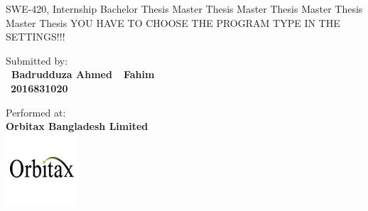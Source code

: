 


\pagestyle{empty}




\begin{center}

\vspace{0.8cm}

\begin{minipage}[t][5cm][s]{\textwidth}%
\centering
\Huge{{}}
\LARGE{{\color{FH2}{\fontsize{16}{24} \selectfont \subTitle\\}}}
\end{minipage}

\ifuseBachelorMediaTechnologiesOne
	\LARGE{SWE-420, Internship }
\else
	\ifuseBachelorMediaTechnologiesTwo
		\LARGE{Bachelor Thesis}
\else
	\ifuseMasterInteractiveTechnologies
		\LARGE{Master Thesis}
\else
	\ifuseMasterDigitalDesign
		\LARGE{Master Thesis}
\else
    \ifuseMasterDigitalMediaProduction
		\LARGE{Master Thesis}
\else
	\ifuseMasterDigitalHealthCare
		\LARGE{Master Thesis}
    \else
        \LARGE{YOU HAVE TO CHOOSE THE PROGRAM TYPE IN THE SETTINGS!!!}
  	\fi
\fi
\fi
\fi\fi\fi




\vspace{2cm}

Submitted by:\\ 
\fontsize{15pt}{15pt}\selectfont
\textbf{\ Badrudduza Ahmed\ \ Fahim} \\
\fontsize{11pt}{15pt}\selectfont
\ \textbf{2016831020}

\vspace{1.8cm}

Performed at:\\ 
\textbf{Orbitax Bangladesh Limited} \\
\fontsize{15pt}{15pt}\selectfont
\includegraphics[width=0.2\textwidth]{Figures/orbitax_logo.png}\\[0.1in]


\end{center}
